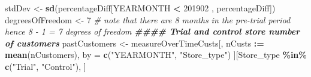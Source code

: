 \documentclass[
]{article}
\newenvironment{Shaded}{\begin{snugshade}}{\end{snugshade}}
\newcommand{\CommentTok}[1]{\textcolor[rgb]{0.56,0.35,0.01}{\textit{#1}}}
\newcommand{\DecValTok}[1]{\textcolor[rgb]{0.00,0.00,0.81}{#1}}
\newcommand{\DocumentationTok}[1]{\textcolor[rgb]{0.56,0.35,0.01}{\textbf{\textit{#1}}}}
\newcommand{\FunctionTok}[1]{\textcolor[rgb]{0.13,0.29,0.53}{\textbf{#1}}}
\newcommand{\NormalTok}[1]{#1}
\newcommand{\OtherTok}[1]{\textcolor[rgb]{0.56,0.35,0.01}{#1}}
\newcommand{\SpecialCharTok}[1]{\textcolor[rgb]{0.81,0.36,0.00}{\textbf{#1}}}
\newcommand{\StringTok}[1]{\textcolor[rgb]{0.31,0.60,0.02}{#1}}
\begin{document}
\begin{Shaded}
\begin{Highlighting}[]
\NormalTok{stdDev }\OtherTok{\textless{}{-}} \FunctionTok{sd}\NormalTok{(percentageDiff[YEARMONTH }\SpecialCharTok{\textless{}} \DecValTok{201902}\NormalTok{ , percentageDiff])}
\NormalTok{degreesOfFreedom }\OtherTok{\textless{}{-}} \DecValTok{7} 
\CommentTok{\# note that there are 8 months in the pre{-}trial period hence 8 {-} 1 = 7 degrees of freedom}
\DocumentationTok{\#\#\#\# Trial and control store number of customers}
\NormalTok{pastCustomers }\OtherTok{\textless{}{-}}\NormalTok{ measureOverTimeCusts[, nCusts }\SpecialCharTok{:=} \FunctionTok{mean}\NormalTok{(nCustomers), by }\OtherTok{=} \FunctionTok{c}\NormalTok{(}\StringTok{"YEARMONTH"}\NormalTok{, }\StringTok{"Store\_type"}\NormalTok{)}
\NormalTok{][Store\_type }\SpecialCharTok{\%in\%} \FunctionTok{c}\NormalTok{(}\StringTok{"Trial"}\NormalTok{, }\StringTok{"Control"}\NormalTok{), ]}


\end{Highlighting}
\end{Shaded}
\end{document}

